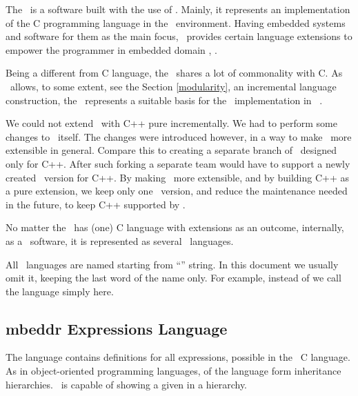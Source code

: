 
The \mbdp\ is a software built with the use of \jbmps. Mainly, it represents an implementation of the C programming language in the \jbmps\ environment. Having embedded systems
and software for them as the main focus, \mbdr\ provides certain language extensions to empower the programmer in 
embedded domain \cite{mbeddr-wave}, 
\cite{Voelter:MoDELS:2010}. 

Being a different from C language, the \cpppl\ shares a lot of commonality with C. 
As \jbmps\ allows, to some extent, see the Section \ref{modularity}, an incremental language construction, the \mbdrp\ represents 
a suitable basis for the \cpppl\ implementation in \jbmps\ . 

We could not  extend \mbdr\ with C++ pure incrementally. We had to perform some changes to \mbdr\ itself. 
The changes were introduced however, in a way to make \mbdr\ more extensible in general. Compare this to creating 
a separate branch of \mbdr\ designed only for C++. After such forking a separate team would have to support a newly
created \mbdr\ version for C++. By making \mbdr\ more extensible, and by building C++ as a pure extension, we keep
only one \mbdr\ version, and reduce the maintenance needed in the future, to keep C++ supported by \mbdr.

No matter the \mbdp\ has  (one) C language with extensions as an outcome, internally, as a \jbmps\ software, 
it is represented as several \jbmps\ languages.

All \mbdr\ languages are named starting from ``'' string. In this document we usually omit it,
keeping the last word of the name only. For example, instead of  we call the language 
simply  here.

\subsection{mbeddr Expressions Language}
\label{expressionslang}

The  language contains definitions for all expressions, possible in the \mbdr\ C language.
As in object-oriented programming languages,  of the  language form inheritance hierarchies. 
\jbmps\ is capable of showing a given  in a hierarchy. 


